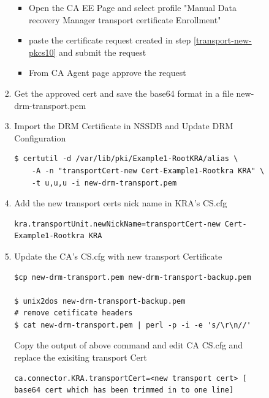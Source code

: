 \documentclass[12pt]{report}
\begin{document}
\begin{enumerate}[label*=\arabic*.]
\begin{enumerate}[label*=\arabic*.]
\begin{enumerate}[label*=\arabic*.]
\begin{enumerate}[label*=\arabic*.]
                                    \begin{itemize}
                                        \item Open the CA EE Page and select profile "Manual Data recovery Manager transport certificate Enrollment"
                                        \item paste the certificate request created in step \ref{transport-new-pkcs10}  and submit the request
                                        \item From CA Agent page approve the request
                                    \end{itemize}
                                \item Get the approved cert  and save the base64 format in a file new-drm-transport.pem
                                \item Import the DRM Certificate in NSSDB and Update DRM Configuration
                                    \begin{lstlisting}[style=bashInputStyle]
$ certutil -d /var/lib/pki/Example1-RootKRA/alias \
    -A -n "transportCert-new Cert-Example1-Rootkra KRA" \
    -t u,u,u -i new-drm-transport.pem 
                                    \end{lstlisting}
                                \item Add the new transport certs nick name in KRA's CS.cfg
                                    \begin{lstlisting}
kra.transportUnit.newNickName=transportCert-new Cert-Example1-Rootkra KRA
                                    \end{lstlisting}
                                \item Update the CA's CS.cfg with new transport Certificate
                                    \begin{lstlisting}[style=bashInputStyle]
$cp new-drm-transport.pem new-drm-transport-backup.pem                                    

$ unix2dos new-drm-transport-backup.pem
# remove cetificate headers 
$ cat new-drm-transport.pem | perl -p -i -e 's/\r\n//'
                                    \end{lstlisting}
                                    
                                    Copy the output of above command and edit CA CS.cfg and replace the exisiting transport Cert

                                    \begin{lstlisting}
ca.connector.KRA.transportCert=<new transport cert> [ base64 cert which has been trimmed in to one line]                                    
                                    \end{lstlisting}


\end{enumerate}
\end{enumerate}
\end{enumerate}
\end{enumerate}
\end{document}
